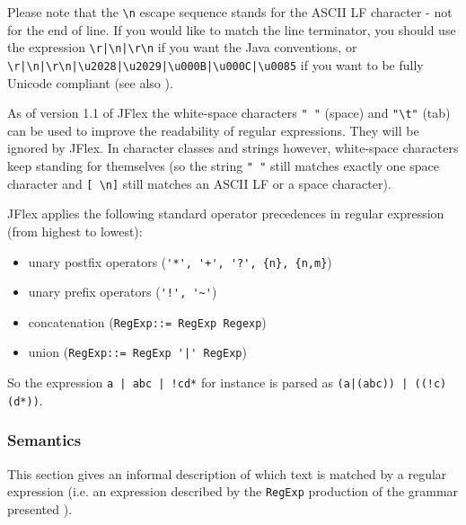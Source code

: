 \documentclass[11pt]{scrartcl}
\begin{document}
Please note that the \verb+\n+ escape sequence stands for the ASCII
LF character - not for the end of line. If you would like to match the
line terminator, you should use the expression \verb+\r|\n|\r\n+ if you want
the Java conventions, or \verb+\r|\n|\r\n|\u2028|\u2029|\u000B|\u000C|\u0085+
if you want to be fully Unicode compliant (see also \cite{unicode_rep}).

As of version 1.1 of JFlex the white-space characters \texttt{" "}
(space) and \verb+"\t"+ (tab) can be used to improve the readability of
regular expressions. They will be ignored by JFlex. In character
classes and strings however, white-space characters keep standing for
themselves (so the string \texttt{" "} still matches exactly one space
character and \verb+[ \n]+ still matches an ASCII LF or a space
character).

JFlex applies the following standard operator precedences in regular
expression (from highest to lowest):

\begin{itemize}
\item
unary postfix operators (\verb-'*', '+', '?', {n}, {n,m}-)

\item
unary prefix operators (\verb-'!', '~'-)

\item
concatenation (\texttt{RegExp::= RegExp Regexp})

\item
union (\verb-RegExp::= RegExp '|' RegExp-)
\end{itemize}

So the expression \verb+a | abc | !cd*+ for instance is parsed as 
\verb+(a|(abc)) | ((!c)(d*))+.

\subsubsection{Semantics\label{Semantics}}
This section gives an informal description of which text is matched by
a regular expression (i.e. an expression described by the \texttt{RegExp}
production of the grammar presented ).
\end{document}
